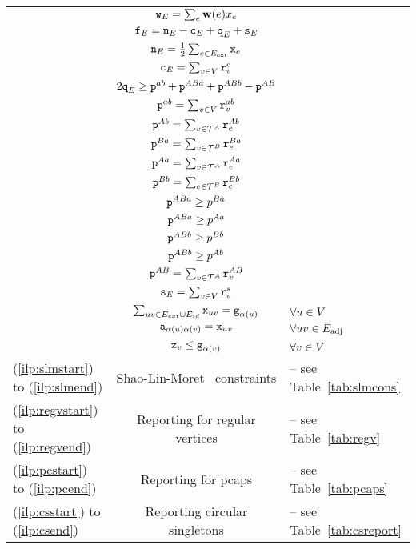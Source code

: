 \begin{algorithm}[tbh]
\begin{constraints}
\begin{tabular}{lcl}
    \cns & ${\texttt{w}}_E = \sum_e \mathbf{w}(e) x_e$\\
	\cns & ${\texttt{f}}_E = {\texttt{n}}_E - {\texttt{c}}_E + {\texttt{q}}_E + {\texttt{s}}_E$\\
    \cns & ${\texttt{n}}_E = \frac{1}{2} \sum_{e \in {E}_{\text{ext}}} {\texttt{x}}_{e}$\\
    \cns & ${\texttt{c}}_E = \sum_{v\in V} {\texttt{r}}^c_v$\\
    \cns & $2{\texttt{q}}_E \geq {\texttt{p}}^{a b}+ {\texttt{p}}^{ABa} + {\texttt{p}}^{ABb} - {\texttt{p}}^{A B} $\\
    \cns & ${\texttt{p}}^{a b} = \sum_{v \in V}{\texttt{r}}^{a b}_v$\\
    \cns & ${\texttt{p}}^{A b} = \sum_{v \in \mathcal{T}^A} {\texttt{r}}^{A b}_e$\\
    \cns & ${\texttt{p}}^{B a} = \sum_{v\in \mathcal{T}^B} {\texttt{r}}^{B a}_e$\\
    \cns & ${\texttt{p}}^{A a} = \sum_{v \in \mathcal{T}^A} {\texttt{r}}^{A a}_e$\\
    \cns & ${\texttt{p}}^{B b} = \sum_{e \in \mathcal{T}^B} {\texttt{r}}^{B b}_e$\\
    \cns & ${\texttt{p}}^{ABa} \geq p^{B a}$\\
    \cns & ${\texttt{p}}^{ABa} \geq p^{A a}$\\
    \cns & ${\texttt{p}}^{ABb} \geq p^{B b}$\\
    \cns & ${\texttt{p}}^{ABb} \geq p^{A b}$\\
    \cns & ${\texttt{p}}^{A B} = \sum_{v\in \mathcal{T}^A} {\texttt{r}}^{A B}_v$\\
    \cns & ${\texttt{s}}_E = \sum_{v\in V} {\texttt{r}}^{s}_{v}$ \\
    \cns & $\sum_{uv\in E_{ext} \cup E_{id} } {\texttt{x}}_{uv}= {\texttt{g}}_{\alpha(u)}$ & $\forall u\in V$  \\
    \cns & ${\texttt{a}}_{\alpha(u)\alpha(v)} = {\texttt{x}}_{uv}$ & $\forall uv \in {E}_\text{adj}$ \\
    \cns & ${\texttt{z}}_{v} \leq {\texttt{g}}_{\alpha (v)}$ & $\forall v \in V$ \\
    (\ref{ilp:slmstart}) to (\ref{ilp:slmend})& Shao-Lin-Moret~\cite{SHA-LIN-MOR-2015} constraints& -- see Table~\ref{tab:slmcons}\\
    (\ref{ilp:regvstart}) to (\ref{ilp:regvend})& Reporting for regular vertices& -- see Table~\ref{tab:regv}\\
    (\ref{ilp:pcstart}) to (\ref{ilp:pcend})& Reporting for \gls{pcaps}& -- see Table~\ref{tab:pcaps}\\
    (\ref{ilp:csstart}) to (\ref{ilp:csend})& Reporting circular singletons& --  see Table~\ref{tab:csreport}\\    
\end{tabular}

\end{constraints}
\end{algorithm}

